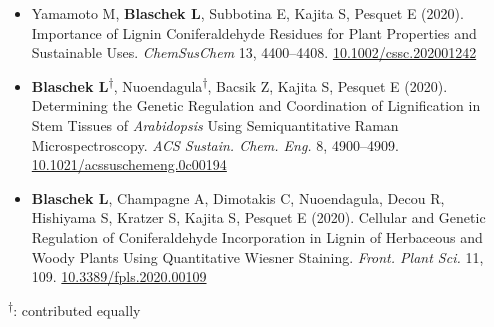 \documentclass[11pt]{article}
\newcommand*{\xdash}[1][3em]{\rule[0.5ex]{#1}{0.55pt}}
\begin{document}
\vspace{-0.175cm}	
\begin{itemize}[label={},itemindent=-9pt,leftmargin=24pt]
	\itemsep-0.1cm
	\item Yamamoto M, \textbf{Blaschek L}, Subbotina E, Kajita S, Pesquet E (2020). Importance of Lignin Coniferaldehyde Residues for Plant Properties and Sustainable Uses. \textit{ChemSusChem} 13, 4400–4408.
	\href{https://doi.org/10.1002/cssc.202001242}{10.1002/cssc.202001242}
	\item \textbf{Blaschek L}\textsuperscript{$\dagger$}, Nuoendagula\textsuperscript{$\dagger$}, Bacsik Z, Kajita S, Pesquet E (2020). Determining the Genetic Regulation and Coordination of Lignification in Stem Tissues of \textit{Arabidopsis} Using Semiquantitative Raman Microspectroscopy. \textit{ACS Sustain. Chem. Eng.} 8, 4900--4909. \href{https://dx.doi.org/10.1021/acssuschemeng.0c00194}{10.1021/acssuschemeng.0c00194}
	\item \textbf{Blaschek L}, Champagne A, Dimotakis C, Nuoendagula, Decou R, Hishiyama S, Kratzer S, Kajita S, Pesquet E (2020). Cellular and Genetic Regulation of Coniferaldehyde Incorporation in Lignin of Herbaceous and Woody Plants Using Quantitative Wiesner Staining. \textit{Front. Plant Sci.} 11, 109. \href{https://doi.org/10.3389/fpls.2020.00109}{10.3389/fpls.2020.00109}
\end{itemize}

%

\textsuperscript{$\dagger$}: contributed equally
\vspace{0.5cm}
\end{document}
